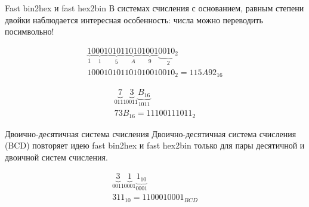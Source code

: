 \documentclass[hyperref=unicode, aspectratio=169]{beamer}
\begin{document}
\begin{frame}{Fast bin2hex и fast hex2bin}
    В системах счисления с основанием, равным степени двойки наблюдается интересная особенность: числа можно переводить посимвольно!
    \begin{example}
        \begin{gather*}
            \underbrace{1}_{1} \underbrace{0001}_{1} \underbrace{0101}_{5} \underbrace{1010}_{A} \underbrace{1001}_{9} \underbrace{0010_{2}}_{2} \\
            100010101101010010010_2 = 115A92_{16}
        \end{gather*}
    \end{example}
    \begin{example}
        \begin{gather*}
            \underbrace{7}_{0111} \underbrace{3}_{0011} \underbrace{B_{16}}_{1011} \\
            73B_{16} = 11100111011_{2}
        \end{gather*}
    \end{example}
\end{frame}

\begin{frame}{Двоично-десятичная система счисления}
    Двоично-десятичная система счисления (BCD) повторяет идею fast bin2hex и fast hex2bin только для пары десятичной и двоичной систем счисления.
    \begin{example}
        \begin{gather*}
            \underbrace{3}_{0011}\underbrace{1}_{0001}\underbrace{1_{10}}_{0001} \\
            311_{10} = 1100010001_{BCD}
        \end{gather*}
    \end{example}
\end{frame}
\end{document}

